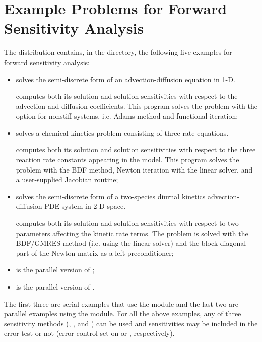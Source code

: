 \section{Example Problems for Forward Sensitivity Analysis}\label{s:fwd_examples}

The {\cvodes} distribution contains, in the 
directory, the following five examples for forward sensitivity analysis:

\begin{itemize}
\item {}
  solves the semi-discrete form of an advection-diffusion equation in 1-D.

  {\cvodes} computes both its solution and solution sensitivities with respect
  to the advection and diffusion coefficients.
  This program solves the problem with the option for nonstiff systems,
  i.e. Adams method and functional iteration;
\item {}
  solves a chemical kinetics problem consisting of three rate equations.

  {\cvodes} computes both its solution and solution sensitivities with respect
  to the three reaction rate constants appearing in the model. 
  This program solves the problem with the BDF method, Newton          
  iteration with the {\cvdense} linear solver, and a user-supplied    
  Jacobian routine;
\item {}
  solves the semi-discrete form of a two-species diurnal kinetics
  advection-diffusion PDE system in 2-D space.

  {\cvodes} computes both its solution and solution sensitivities with respect
  to two parameters affecting the kinetic rate terms.
  The problem is solved with the BDF/GMRES method (i.e.    
  using the {\cvspgmr} linear solver) and the block-diagonal part of the  
  Newton matrix as a left preconditioner;
\item {}
  is the parallel version of ;
\item {}
  is the parallel version of .
\end{itemize}
The first three are serial examples that use the {\nvecs} module and
the last two are parallel examples using the {\nvecp} module.
For all the above examples, any of three sensitivity methods (, 
, and ) can be used and sensitivities may be 
included in the error test or not (error control set on  or ,
respectively).

